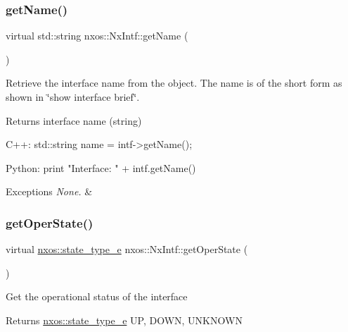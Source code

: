\subsubsection{\texorpdfstring{get\+Name()}{getName()}}
{\footnotesize\ttfamily virtual std\+::string nxos\+::\+Nx\+Intf\+::get\+Name (\begin{DoxyParamCaption}{ }\end{DoxyParamCaption})\hspace{0.3cm}{\ttfamily [pure virtual]}}

Retrieve the interface name from the object. The name is of the short form as shown in \char`\"{}show interface brief\char`\"{}.

\begin{DoxyReturn}{Returns}
interface name (string)
\end{DoxyReturn}

\begin{DoxyCode}
C++:
       std::string name = intf->getName();

Python:
       print \textcolor{stringliteral}{"Interface: "} + intf.getName() 
\end{DoxyCode}



\begin{DoxyExceptions}{Exceptions}
{\em None.} & \\
\hline
\end{DoxyExceptions}
\mbox{\label{classnxos_1_1_nx_intf_abd5291d975d3193c3603efd7ec17deda}} 
\subsubsection{\texorpdfstring{get\+Oper\+State()}{getOperState()}}
{\footnotesize\ttfamily virtual \mbox{\hyperlink{namespacenxos_a7c257059d03188765435b36e95dbb764}{nxos\+::state\+\_\+type\+\_\+e}} nxos\+::\+Nx\+Intf\+::get\+Oper\+State (\begin{DoxyParamCaption}{ }\end{DoxyParamCaption})\hspace{0.3cm}{\ttfamily [pure virtual]}}

Get the operational status of the interface

\begin{DoxyReturn}{Returns}
\mbox{\hyperlink{namespacenxos_a7c257059d03188765435b36e95dbb764}{nxos\+::state\+\_\+type\+\_\+e}} UP, D\+O\+WN, U\+N\+K\+N\+O\+WN
\end{DoxyReturn}

